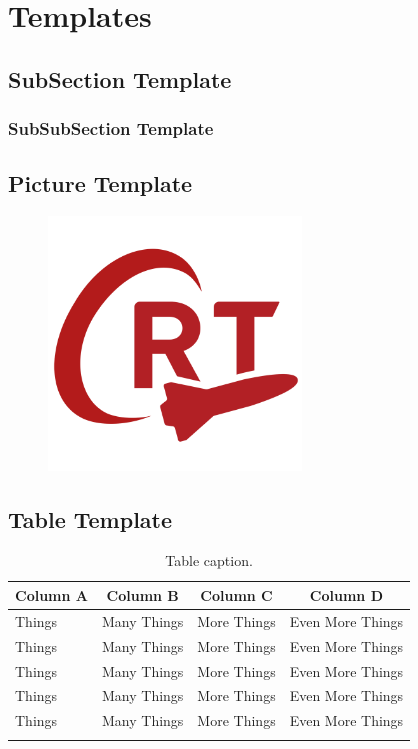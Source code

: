\section{Templates}
\subsection{SubSection Template}
\subsubsection{SubSubSection Template}

\subsection{Picture Template}
\begin{figure}[H]
    \centering
    \includegraphics[width=0.6\textwidth]{Images/logo_small.png}
\end{figure}




\subsection{Table Template}


\begin{longtable}[c]{| l | l | l | l |}
 
\hline
\multicolumn{1}{|c|}{\textbf{Column A}} &
\multicolumn{1}{c|}{\textbf{Column B}} &
\multicolumn{1}{c|}{\textbf{Column C}} &
\multicolumn{1}{c|}{\textbf{Column D}} \\
\hline

Things & Many Things & More Things & Even More Things \\
Things & Many Things & More Things & Even More Things \\
Things & Many Things & More Things & Even More Things \\
Things & Many Things & More Things & Even More Things \\
Things & Many Things & More Things & Even More Things \\

\hline
\endfirsthead

\caption{Table caption.} \\

\end{longtable}



